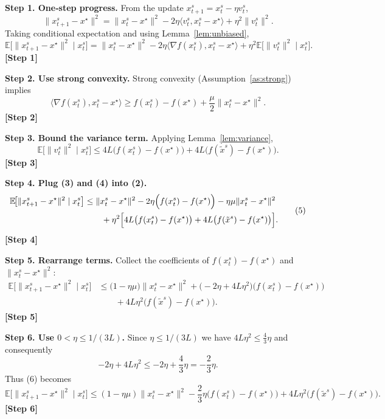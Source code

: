 \documentclass{article}
\newcommand{\E}{\mathbb{E}}
\begin{document}
\medskip
\noindent\textbf{Step 1. One‑step progress.}  
From the update $x_{t+1}^{s}=x_{t}^{s}-\eta v_{t}^{s}$,
\[
\|x_{t+1}^{s}-x^{\star}\|^{2}
 =\|x_{t}^{s}-x^{\star}\|^{2}
   -2\eta\langle v_{t}^{s},x_{t}^{s}-x^{\star}\rangle
   +\eta^{2}\|v_{t}^{s}\|^{2}. \tag{1}
\]
Taking conditional expectation and using Lemma~\ref{lem:unbiased},
\[
\E\!\bigl[\|x_{t+1}^{s}-x^{\star}\|^{2}\mid x_{t}^{s}\bigr]
 =\|x_{t}^{s}-x^{\star}\|^{2}
   -2\eta\langle \nabla f(x_{t}^{s}),x_{t}^{s}-x^{\star}\rangle
   +\eta^{2}\E\!\bigl[\|v_{t}^{s}\|^{2}\mid x_{t}^{s}\bigr]. \tag{2}
\]
\textbf{[Step 1]}

\medskip
\noindent\textbf{Step 2. Use strong convexity.}  
Strong convexity (Assumption~\ref{as:strong}) implies
\[
\langle \nabla f(x_{t}^{s}),x_{t}^{s}-x^{\star}\rangle
\ge f(x_{t}^{s})-f(x^{\star})+\frac{\mu}{2}\|x_{t}^{s}-x^{\star}\|^{2}. \tag{3}
\]
\textbf{[Step 2]}

\medskip
\noindent\textbf{Step 3. Bound the variance term.}  
Applying Lemma~\ref{lem:variance},
\[
\E\!\bigl[\|v_{t}^{s}\|^{2}\mid x_{t}^{s}\bigr]
\le 4L\bigl(f(x_{t}^{s})-f(x^{\star})\bigr)
   +4L\bigl(f(\tilde{x}^{s})-f(x^{\star})\bigr). \tag{4}
\]
\textbf{[Step 3]}

\medskip
\noindent\textbf{Step 4. Plug (3) and (4) into (2).}  
\[
\begin{aligned}
\E\!\bigl[\|x_{t+1}^{s}-x^{\star}\|^{2}\mid x_{t}^{s}\bigr]
 &\le \|x_{t}^{s}-x^{\star}\|^{2}
    -2\eta\Bigl(f(x_{t}^{s})-f(x^{\star})\Bigr)
    -\eta\mu\|x_{t}^{s}-x^{\star}\|^{2}\\
 &\qquad +\eta^{2}\Bigl[4L\bigl(f(x_{t}^{s})-f(x^{\star})\bigr)
                     +4L\bigl(f(\tilde{x}^{s})-f(x^{\star})\bigr)\Bigr].
\end{aligned}
\tag{5}
\]
\textbf{[Step 4]}

\medskip
\noindent\textbf{Step 5. Rearrange terms.}  
Collect the coefficients of $f(x_{t}^{s})-f(x^{\star})$ and $\|x_{t}^{s}-x^{\star}\|^{2}$:
\[
\begin{aligned}
\E\!\bigl[\|x_{t+1}^{s}-x^{\star}\|^{2}\mid x_{t}^{s}\bigr]
 &\le \bigl(1-\eta\mu\bigr)\|x_{t}^{s}-x^{\star}\|^{2}
    +\bigl( -2\eta+4L\eta^{2}\bigr)\bigl(f(x_{t}^{s})-f(x^{\star})\bigr)\\
 &\qquad +4L\eta^{2}\bigl(f(\tilde{x}^{s})-f(x^{\star})\bigr).
\end{aligned}
\tag{6}
\]
\textbf{[Step 5]}

\medskip
\noindent\textbf{Step 6. Use $0<\eta\le 1/(3L)$.}  
Since $\eta\le 1/(3L)$ we have $4L\eta^{2}\le \frac{4}{3}\eta$ and consequently
\[
-2\eta+4L\eta^{2}\le -2\eta+\frac{4}{3}\eta = -\frac{2}{3}\eta. \tag{7}
\]
Thus (6) becomes
\[
\E\!\bigl[\|x_{t+1}^{s}-x^{\star}\|^{2}\mid x_{t}^{s}\bigr]
 \le (1-\eta\mu)\|x_{t}^{s}-x^{\star}\|^{2}
    -\frac{2}{3}\eta\bigl(f(x_{t}^{s})-f(x^{\star})\bigr)
    +4L\eta^{2}\bigl(f(\tilde{x}^{s})-f(x^{\star})\bigr).
\tag{8}
\]
\textbf{[Step 6]}
\end{document}

